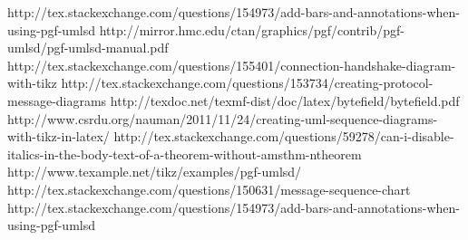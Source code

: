 \documentclass[11pt]{article}
\begin{document}
http://tex.stackexchange.com/questions/154973/add-bars-and-annotations-when-using-pgf-umlsd
http://mirror.hmc.edu/ctan/graphics/pgf/contrib/pgf-umlsd/pgf-umlsd-manual.pdf
http://tex.stackexchange.com/questions/155401/connection-handshake-diagram-with-tikz
http://tex.stackexchange.com/questions/153734/creating-protocol-message-diagrams
http://texdoc.net/texmf-dist/doc/latex/bytefield/bytefield.pdf
http://www.csrdu.org/nauman/2011/11/24/creating-uml-sequence-diagrams-with-tikz-in-latex/
http://tex.stackexchange.com/questions/59278/can-i-disable-italics-in-the-body-text-of-a-theorem-without-amsthm-ntheorem
http://www.texample.net/tikz/examples/pgf-umlsd/
http://tex.stackexchange.com/questions/150631/message-sequence-chart
http://tex.stackexchange.com/questions/154973/add-bars-and-annotations-when-using-pgf-umlsd
\end{document}
